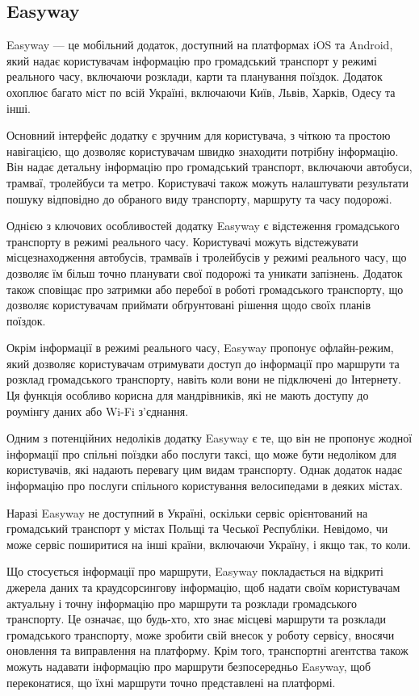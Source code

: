 \subsection{Easyway}
\label{subsec:easyway-subsection}

Easyway --- це мобільний додаток, доступний на платформах iOS та 
Android, який надає користувачам інформацію про громадський транспорт 
у режимі реального часу, включаючи розклади, карти та планування 
поїздок. Додаток охоплює багато міст по всій Україні, включаючи Київ, 
Львів, Харків, Одесу та інші.

Основний інтерфейс додатку є зручним для користувача, з чіткою та 
простою навігацією, що дозволяє користувачам швидко знаходити потрібну 
інформацію. Він надає детальну інформацію про громадський транспорт, 
включаючи автобуси, трамваї, тролейбуси та метро. Користувачі також 
можуть налаштувати результати пошуку відповідно до обраного виду 
транспорту, маршруту та часу подорожі.

Однією з ключових особливостей додатку Easyway є відстеження 
громадського транспорту в режимі реального часу. Користувачі можуть 
відстежувати місцезнаходження автобусів, трамваїв і тролейбусів у 
режимі реального часу, що дозволяє їм більш точно планувати свої 
подорожі та уникати запізнень. Додаток також сповіщає про затримки або 
перебої в роботі громадського транспорту, що дозволяє користувачам 
приймати обґрунтовані рішення щодо своїх планів поїздок.

Окрім інформації в режимі реального часу, Easyway пропонує 
офлайн-режим, який дозволяє користувачам отримувати доступ до 
інформації про маршрути та розклад громадського транспорту, навіть 
коли вони не підключені до Інтернету. Ця функція особливо корисна для 
мандрівників, які не мають доступу до роумінгу даних або Wi-Fi 
з'єднання.

Одним з потенційних недоліків додатку Easyway є те, що він не пропонує 
жодної інформації про спільні поїздки або послуги таксі, що може бути 
недоліком для користувачів, які надають перевагу цим видам транспорту. 
Однак додаток надає інформацію про послуги спільного користування 
велосипедами в деяких містах.

Наразі Easyway не доступний в Україні, оскільки сервіс орієнтований на 
громадський транспорт у містах Польщі та Чеської Республіки. Невідомо, 
чи може сервіс поширитися на інші країни, включаючи Україну, і якщо 
так, то коли.

Що стосується інформації про маршрути, Easyway покладається на 
відкриті джерела даних та краудсорсингову інформацію, щоб надати своїм 
користувачам актуальну і точну інформацію про маршрути та розклади 
громадського транспорту. Це означає, що будь-хто, хто знає місцеві 
маршрути та розклади громадського транспорту, може зробити свій внесок 
у роботу сервісу, вносячи оновлення та виправлення на платформу. Крім 
того, транспортні агентства також можуть надавати інформацію про 
маршрути безпосередньо Easyway, щоб переконатися, що їхні маршрути 
точно представлені на платформі.

